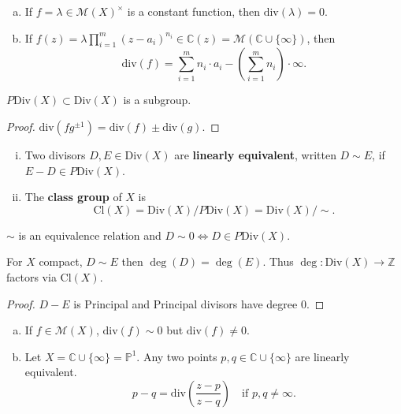 \documentclass{article}
\begin{document}
\begin{example}
    \begin{enumerate}[(a)]
        \item If $f = \lambda \in \mathcal{M}(X)^\times$ is a constant function, then $\text{div}(\lambda) = 0$.
        \item If $f(z) = \lambda \prod_{i=1}^m (z-a_i)^{n_i} \in \mathbb{C}(z) = \mathcal{M}(\mathbb{C} \cup \{\infty\})$, then
        $$\text{div}(f) = \sum_{i=1}^m n_i \cdot a_i - \left(\sum_{i=1}^m n_i\right) \cdot \infty.$$
    \end{enumerate}
\end{example}

\begin{lemma}
    $P\text{Div}(X) \subset \text{Div}(X)$ is a subgroup.
\end{lemma}
\begin{proof}
    $\text{div}(fg^{\pm 1}) = \text{div}(f) \pm \text{div}(g)$.
\end{proof}

\begin{definition}
    \begin{enumerate}[(i)]
        \item Two divisors $D, E \in \text{Div}(X)$ are \textbf{linearly equivalent}, written $D \sim E$,
        if $E - D \in P\text{Div}(X)$.
        \item The \textbf{class group} of $X$ is
        $$\text{Cl}(X) = \text{Div}(X) / P\text{Div}(X) = \text{Div}(X) / \sim.$$
    \end{enumerate}
\end{definition}

\begin{remark}
    $\sim$ is an equivalence relation and $D \sim 0 \iff D \in P\text{Div}(X)$.
\end{remark}

\begin{lemma}
    For $X$ compact, $D \sim E$ then $\deg(D) = \deg(E)$.
    Thus $\deg: \text{Div}(X) \to \mathbb{Z}$ factors via $\text{Cl}(X)$.
\end{lemma}
\begin{proof}
    $D - E$ is Principal and Principal divisors have degree $0$.
\end{proof}

\begin{example}
    \begin{enumerate}[(a)]
        \item If $f \in \mathcal{M}(X)$, $\text{div}(f) \sim 0$ but $\text{div}(f) \neq 0$.
        \item Let $X = \mathbb{C} \cup \{\infty\} = \mathbb{P}^1$. Any two points $p, q \in \mathbb{C} \cup \{\infty\}$ are linearly equivalent.
        $$p - q = \text{div} \left(\frac{z - p}{z - q}\right) \quad \text{if } p, q \neq \infty.$$
    \end{enumerate}
\end{example}
\end{document}
